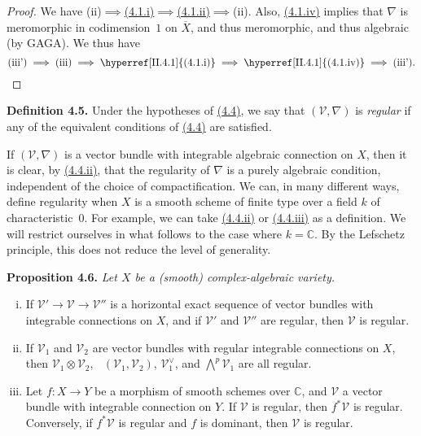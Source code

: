 \documentclass{report}
\newenvironment{itenv}[1]
  {\phantomsection\par\medskip\noindent\textbf{#1.}\itshape}
  {\par\medskip}
\newenvironment{rmenv}[1]
  {\phantomsection\par\medskip\noindent\textbf{#1.}\rmfamily}
  {\par\medskip}
\renewcommand{\cal}[1]{{\mathcal{#1}}}
\newcommand{\CC}{\mathbb{C}}
\DeclareMathOperator{\shHom}{\underline{Hom}}
\begin{document}
\begin{proof}
  We have \mbox{(ii)$\implies$\hyperref[II.4.1]{(4.1.i)}$\implies$\hyperref[II.4.1]{(4.1.ii)}$\implies$(ii)}.
  Also, \hyperref[II.4.1]{(4.1.iv)} implies that $\nabla$ is meromorphic in codimension~$1$ on $\overline{X}$, and thus meromorphic, and thus algebraic (by GAGA).
  We thus have
  \[
    \mbox{(iii')}
    \implies \mbox{(iii)}
    \implies \mbox{\hyperref[II.4.1]{(4.1.i)}}
    \implies \mbox{\hyperref[II.4.1]{(4.1.iv)}}
    \implies \mbox{(iii')}.
  \]
\end{proof}

\begin{rmenv}{Definition 4.5}
\label{II.4.5}
  Under the hypotheses of \hyperref[II.4.4]{(4.4)}, we say that $(\cal{V},\nabla)$ is \emph{regular} if any of the equivalent conditions of \hyperref[II.4.4]{(4.4)} are satisfied.
\end{rmenv}

If $(\cal{V},\nabla)$ is a vector bundle with integrable algebraic connection on $X$, then it is clear, by \hyperref[II.4.4]{(4.4.ii)}, that the regularity of $\nabla$ is a purely algebraic condition, independent of the choice of compactification.
We can, in many different ways, define regularity when $X$ is a smooth scheme of finite type over a field $k$ of characteristic~$0$.
For example, we can take \hyperref[II.4.4]{(4.4.ii)} or \hyperref[II.4.4]{(4.4.iii)} as a definition.
We will restrict ourselves in what follows to the case where $k=\CC$.
By the Lefschetz principle, this does not reduce the level of generality.

\begin{itenv}{Proposition 4.6}
\label{II.4.6}
  Let $X$ be a (smooth) complex-algebraic variety.
  \begin{enumerate}[(i)]
    \item If $\cal{V}'\to\cal{V}\to\cal{V}''$ is a horizontal exact sequence of vector bundles with integrable connections on $X$, and if $\cal{V}'$ and $\cal{V}''$ are regular, then $\cal{V}$ is regular.
    \item If $\cal{V}_1$ and $\cal{V}_2$ are vector bundles with regular integrable connections on $X$, then $\cal{V}_1\otimes\cal{V}_2$, $\shHom(\cal{V}_1,\cal{V}_2)$, $\cal{V}_1^\vee$, and $\bigwedge^p\cal{V}_1$ are all regular.
    \item Let $f\colon X\to Y$ be a morphism of smooth schemes over $\CC$, and $\cal{V}$ a vector bundle with integrable connection on $Y$.
      If $\cal{V}$ is regular, then $f^*\cal{V}$ is regular.
      Conversely, if $f^*\cal{V}$ is regular and $f$ is dominant, then $\cal{V}$ is regular.
  \end{enumerate}
\end{itenv}
\end{document}
